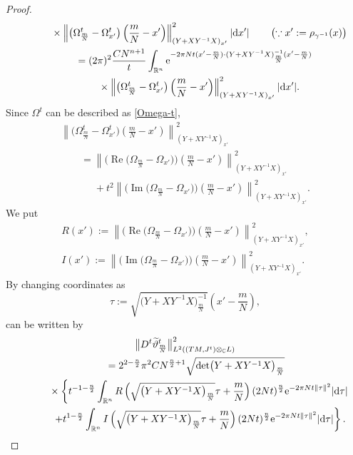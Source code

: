 \documentclass[pdftex]{sigma}
\numberwithin{equation}{section}
\newcommand{\C}{\mathbb{C}}
\newcommand{\R}{\mathbb{R}}
\renewcommand{\tilde}{\widetilde}
\newcommand{\abs}[1]{\lvert#1\rvert}
\newcommand{\norm}[1]{\lVert#1\rVert}
\def\re{\operatorname{Re}}
\def\im{\operatorname{Im}}
\begin{document}
\begin{proof}
\begin{gather*}
\phantom{\qquad=}{} \times \left\lVert \bigl( \Omega^t_{\frac{m}{N}}-\Omega^t_{x'}\bigr)\left(\frac{m}{N}-x'\right)\right\rVert ^2_{(Y+XY^{-1}X)_{x'}}\abs{{\rm d}x'}\qquad \left(\because x':=\rho_{\gamma^{-1}}(x)\right) \\
\qquad= (2\pi)^2\frac{C N^{n+1}}{t}\int_{\R^n} {\rm e}^{-2\pi Nt(x'-\frac{m}{N})\cdot ( Y+XY^{-1}X)^{-1}_{\frac{m}{N}}(x'-\frac{m}{N})}\\
\phantom{\qquad=}{} \times \left\lVert \bigl( \Omega^t_{\frac{m}{N}}-\Omega^t_{x'}\bigr)\left(\frac{m}{N}-x'\right)\right\rVert ^2_{(Y+XY^{-1}X)_{x'}}\abs{{\rm d}x'}.
\end{gather*}
Since $\Omega^t$ can be described as \eqref{Omega-t},
\begin{gather*}
\left\lVert \bigl( \Omega^t_{\frac{m}{N}}-\Omega^t_{x'}\bigr)\left(\frac{m}{N}-x'\right)\right\rVert ^2_{(Y+XY^{-1}X)_{x'}}\\
\qquad=\left\lVert \bigl(\re \bigl( \Omega_{\frac{m}{N}}-\Omega_{x'}\bigr)\bigr)\left(\frac{m}{N}-x'\right)\right\rVert ^2_{(Y+XY^{-1}X)_{x'}}\\
\phantom{\qquad=}{} +t^2\left\lVert \bigl(\im \bigl( \Omega_{\frac{m}{N}}-\Omega_{x'}\bigr)\bigr)\left(\frac{m}{N}-x'\right)\right\rVert ^2_{(Y+XY^{-1}X)_{x'}}.
\end{gather*}
We put
\begin{gather*}
R(x'):=\left\lVert \bigl(\re \bigl( \Omega_{\frac{m}{N}}-\Omega_{x'}\bigr)\bigr)\left(\frac{m}{N}-x'\right)\right\rVert ^2_{(Y+XY^{-1}X)_{x'}}, \\
I(x'):=\left\lVert \bigl(\im \bigl( \Omega_{\frac{m}{N}}-\Omega_{x'}\bigr)\bigr)\left(\frac{m}{N}-x'\right)\right\rVert ^2_{(Y+XY^{-1}X)_{x'}}.
\end{gather*}
By changing coordinates as
\[
\tau:=\sqrt{\bigl(Y+XY^{-1}X\bigr)_{\frac{m}{N}}^{-1}}\left(x'-\frac{m}{N}\right),
\]
 \smash{$\big\|D^t {\tilde \vartheta}^t_{\frac{m}{N}}\big\|_{L^2((TM, J^t)\otimes_{\C}L)}^2$} can be written by
\begin{gather*}
\big\|D^t {\tilde \vartheta}^t_{\frac{m}{N}}\big\|_{L^2((TM, J^t)\otimes_{\C}L)}^2 \\
\qquad{}
 = 2^{2-\frac{n}{2}}\pi^2 C N^{\frac{n}{2}+1}\sqrt{\det \bigl(Y+XY^{-1}X\bigr)_{\frac{m}{N}}}\\
\phantom{\qquad=}{}\times \left\{ t^{-1-\frac{n}{2}} \int_{\R^n} R\left(\sqrt{\bigl(Y+XY^{-1}X\bigr)_{\frac{m}{N}}}\tau +\frac{m}{N}\right)(2Nt)^\frac{n}{2} {\rm e}^{-2\pi Nt\norm{\tau}^2}\abs{{\rm d}\tau} \right.\\
\phantom{\qquad=}{}\left. +t^{1-\frac{n}{2}} \int_{\R^n} I\left(\sqrt{\bigl(Y+XY^{-1}X\bigr)_{\frac{m}{N}}}\tau +\frac{m}{N}\right)(2Nt)^\frac{n}{2} {\rm e}^{-2\pi Nt\norm{\tau}^2}\abs{{\rm d}\tau}\right\}.

\end{gather*}
\end{proof}
\end{document}
